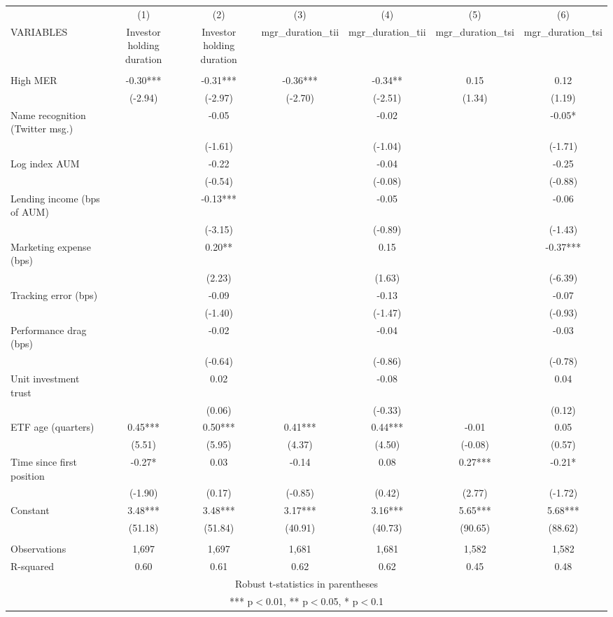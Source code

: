 \documentclass[]{article}
\begin{document}
\begin{tabular}{lcccccc} \hline
 & (1) & (2) & (3) & (4) & (5) & (6) \\
VARIABLES & Investor holding duration & Investor holding duration & mgr\_duration\_tii & mgr\_duration\_tii & mgr\_duration\_tsi & mgr\_duration\_tsi \\ \hline
 &  &  &  &  &  &  \\
High MER & -0.30*** & -0.31*** & -0.36*** & -0.34** & 0.15 & 0.12 \\
 & (-2.94) & (-2.97) & (-2.70) & (-2.51) & (1.34) & (1.19) \\
Name recognition (Twitter msg.) &  & -0.05 &  & -0.02 &  & -0.05* \\
 &  & (-1.61) &  & (-1.04) &  & (-1.71) \\
Log index AUM &  & -0.22 &  & -0.04 &  & -0.25 \\
 &  & (-0.54) &  & (-0.08) &  & (-0.88) \\
Lending income (bps of AUM) &  & -0.13*** &  & -0.05 &  & -0.06 \\
 &  & (-3.15) &  & (-0.89) &  & (-1.43) \\
Marketing expense (bps) &  & 0.20** &  & 0.15 &  & -0.37*** \\
 &  & (2.23) &  & (1.63) &  & (-6.39) \\
Tracking error (bps) &  & -0.09 &  & -0.13 &  & -0.07 \\
 &  & (-1.40) &  & (-1.47) &  & (-0.93) \\
Performance drag (bps) &  & -0.02 &  & -0.04 &  & -0.03 \\
 &  & (-0.64) &  & (-0.86) &  & (-0.78) \\
Unit investment trust &  & 0.02 &  & -0.08 &  & 0.04 \\
 &  & (0.06) &  & (-0.33) &  & (0.12) \\
ETF age (quarters) & 0.45*** & 0.50*** & 0.41*** & 0.44*** & -0.01 & 0.05 \\
 & (5.51) & (5.95) & (4.37) & (4.50) & (-0.08) & (0.57) \\
Time since first position & -0.27* & 0.03 & -0.14 & 0.08 & 0.27*** & -0.21* \\
 & (-1.90) & (0.17) & (-0.85) & (0.42) & (2.77) & (-1.72) \\
Constant & 3.48*** & 3.48*** & 3.17*** & 3.16*** & 5.65*** & 5.68*** \\
 & (51.18) & (51.84) & (40.91) & (40.73) & (90.65) & (88.62) \\
 &  &  &  &  &  &  \\
Observations & 1,697 & 1,697 & 1,681 & 1,681 & 1,582 & 1,582 \\
 R-squared & 0.60 & 0.61 & 0.62 & 0.62 & 0.45 & 0.48 \\ \hline
\multicolumn{7}{c}{ Robust t-statistics in parentheses} \\
\multicolumn{7}{c}{ *** p$<$0.01, ** p$<$0.05, * p$<$0.1} \\
\end{tabular}
\end{document}
